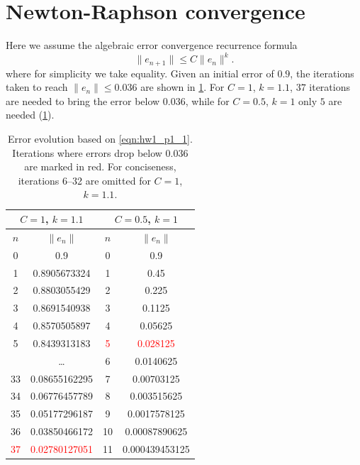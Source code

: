 \pagestyle{fancy}
\setlength{\headheight}{16pt}
\fancyhead{} %
\fancyfoot{} %
\fancyfoot[C]{\thepage}

\section{Newton-Raphson convergence}
Here we assume the algebraic error convergence recurrence formula 
\begin{equation}\label{eqn:hw1_p1_1}
    \| e_{n+1} \| \leq C \| e_n \|^k.
\end{equation}
where for simplicity we take equality. 
Given an initial error of $0.9$, the iterations taken to reach $\| e_n \| \leq 0.036$ are shown in \cref{tab:hw1_p1_1}.
For $C=1$, $k=1.1$, $37$ iterations are needed to bring the error below $0.036$, while for $C=0.5$, $k=1$ only $5$ are needed (\cref{tab:hw1_p1_1}). 

\begin{table}[!ht]
    \centering
    \begin{tabular}{|c|c|c|c|}
        \hline
        \multicolumn{2}{|c|}{$C=1$, $k=1.1$} & \multicolumn{2}{|c|}{$C=0.5$, $k=1$} \\
        \hline
        $n$ & $ \|e_n \| $ & $n$ & $\|e_n \|$ \\
        \hline
        0 & 0.9 & 0 & 0.9 \\
        \hline 
        1 & 0.8905673324 & 1 & 0.45 \\
        \hline 
        2 & 0.8803055429 & 2 & 0.225 \\
        \hline 
        3 & 0.8691540938 & 3 & 0.1125 \\
        \hline 
        4 & 0.8570505897 & 4 & 0.05625 \\
        \hline 
        5 & 0.8439313183 & \textcolor{red}{5} & \textcolor{red}{0.028125} \\
        \hline 
          & \ldots & 6 & 0.0140625 \\
        \hline 
        33 & 0.08655162295 & 7 & 0.00703125 \\
        \hline 
        34 & 0.06776457789 & 8 & 0.003515625 \\
        \hline 
        35 & 0.05177296187 & 9 & 0.0017578125 \\
        \hline 
        36 & 0.03850466172 & 10 & 0.00087890625 \\
        \hline 
        \textcolor{red}{37} & \textcolor{red}{0.02780127051} & 11 & 0.000439453125 \\
        \hline 
    \end{tabular}
    \caption{
        Error evolution based on \cref{eqn:hw1_p1_1}. Iterations where errors drop below $0.036$ are marked in red. 
        For conciseness, iterations 6--32 are omitted for $C = 1$, $k = 1.1$.
    }
    \label{tab:hw1_p1_1}
\end{table}

